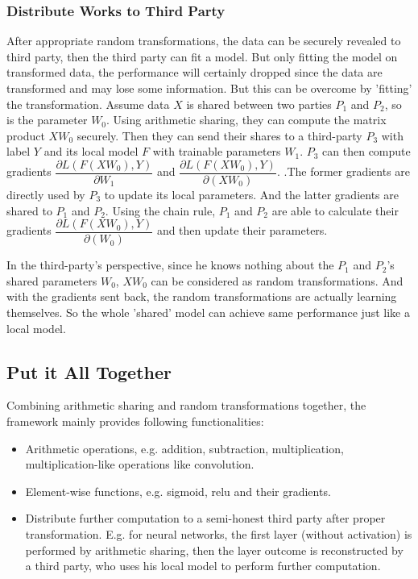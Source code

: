 \subsubsection{Distribute Works to Third Party}
After appropriate random transformations, the data can be securely revealed to third party, then the third party can fit a model. But only fitting the model on transformed data, the performance will certainly dropped since the data are transformed and may lose some information. But this can be overcome by 'fitting' the transformation. Assume data $X$ is shared between two parties $P_1$ and $P_2$, so is the parameter $W_0$. Using arithmetic sharing, they can compute the matrix product $XW_0$ securely. Then they can send their shares to a third-party $P_3$ with label $Y$ and its local model $F$ with trainable parameters $W_1$. $P_3$ can then compute gradients $\dfrac{\partial L(F(XW_0), Y)}{\partial W_1}$ and $\dfrac{\partial L(F(XW_0), Y)}{\partial (XW_0)}$. .The former gradients are directly used by $P_3$ to update its local parameters. And the latter gradients are shared to $P_1$ and $P_2$. Using the chain rule, $P_1$ and $P_2$ are able to calculate their gradients $\dfrac{\partial L(F(XW_0), Y)}{\partial (W_0)}$ and then update their parameters. 

In the third-party's perspective, since he knows nothing about the $P_1$ and $P_2$'s shared parameters $W_0$, $XW_0$ can be considered as random transformations. And with the gradients sent back, the random transformations are actually learning themselves. So the whole 'shared' model can achieve same performance just like a local model.

\subsection{Put it All Together}
Combining arithmetic sharing and random transformations together, the framework mainly provides following functionalities:
\begin{itemize}
    \item Arithmetic operations, e.g. addition, subtraction, multiplication, multiplication-like operations like convolution.
    \item Element-wise functions, e.g. sigmoid, relu and their gradients.
    \item Distribute further computation to a semi-honest third party after proper transformation. E.g. for neural networks, the first layer (without activation) is performed by arithmetic sharing, then the layer outcome is reconstructed by a third party, who uses his local model to perform further computation.
\end{itemize}

